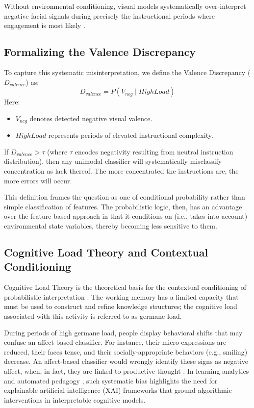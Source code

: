 \documentclass[conference]{IEEEtran}
\begin{document}
Without environmental conditioning, visual models systematically over-interpret negative facial signals during precisely the instructional periods where engagement is most likely \cite{b4}.

\subsection{Formalizing the Valence Discrepancy}
To capture this systematic misinterpretation, we define the Valence Discrepancy ($D_{valence}$) as:
\begin{equation}
D_{valence} = P(V_{neg} \mid HighLoad)
\end{equation}
Here:
\begin{itemize}
    \item $V_{neg}$ denotes detected negative visual valence.
    \item $HighLoad$ represents periods of elevated instructional complexity.
\end{itemize}

If $D_{valence} > \tau$ (where $\tau$ encodes negativity resulting from neutral instruction distribution), then any unimodal classifier will systematically misclassify concentration as lack thereof. The more concentrated the instructions are, the more errors will occur.

This definition frames the question as one of conditional probability rather than simple classification of features. The probabilistic logic, then, has an advantage over the feature-based approach in that it conditions on (i.e., takes into account) environmental state variables, thereby becoming less sensitive to them.

\subsection{Cognitive Load Theory and Contextual Conditioning}

Cognitive Load Theory is the theoretical basis for the contextual conditioning of probabilistic interpretation \cite{b5}. The working memory has a limited capacity that must be used to construct and refine knowledge structures; the cognitive load associated with this activity is referred to as germane load.

During periods of high germane load, people display behavioral shifts that may confuse an affect-based classifier. For instance, their micro-expressions are reduced, their faces tense, and their socially-appropriate behaviors (e.g., smiling) decrease. An affect-based classifier would wrongly identify these signs as negative affect, when, in fact, they are linked to productive thought \cite{b20}. In learning analytics and automated pedagogy \cite{b24}, such systematic bias highlights the need for explainable artificial intelligence (XAI) frameworks \cite{b23} that ground algorithmic interventions in interpretable cognitive models.
\end{document}
